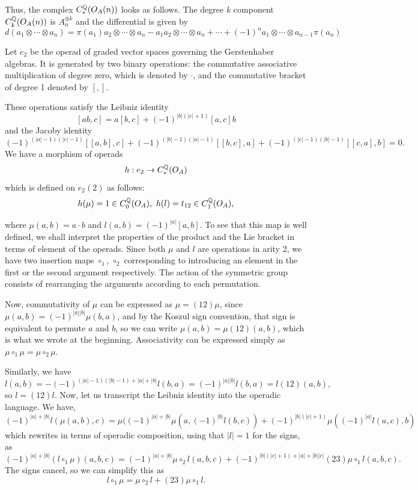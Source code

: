 \documentclass[TFM.tex]{subfiles}
\begin{document}
Thus, the complex $C_*^{\mathbb{Q}}(O_A(n))$ looks as follows. The degree $k$ component $C_k^{\mathbb{Q}}(O_A(n))$ is $A_n^{\otimes k}$ and the differential is given by %
\[
d(a_1\otimes\cdots\otimes a_n)=\pi(a_1)a_2\otimes\cdots\otimes a_n-a_1a_2\otimes \cdots\otimes a_n+\cdots+(-1)^{n}a_1\otimes\cdots\otimes a_{n-1}\pi(a_n)
\]

Let $e_2$ be the operad of graded vector spaces governing the Gerstenhaber algebras.
It is generated by two binary operations: the commutative associative multiplication of degree zero, which is denoted by $\cdot$, and the commutative bracket of degree 1 denoted by $[,]$. 

These operations satisfy the Leibniz identity
\[
[ab, c]= a[b, c]+(-1)^{|b|(|c|+1)}[a,c]b
\]
and the Jacoby identity
\[
(-1)^{(|a|-1)(|c|-1)}[[a,b],c]+(-1)^{(|b|-1)(|a|-1)}[[b,c],a]+(-1)^{(|c|-1)(|b|-1)}[[c,a],b]=0.
\]
We have a morphism of operads
\[
h:e_2\to C_*^{\mathbb{Q}}(O_A)
\]
which is defined on $e_2(2)$ as follows:
\[
h(\mu)=1\in C_0^\Q(O_A),\ h(l)=t_{12}\in C_1^\Q(O_A),
\]

where $\mu(a,b)=a\cdot b$ and $l(a,b)=(-1)^{|a|}[a,b]$. To see that this map is well defined, we shall interpret the properties of the product and the Lie bracket in terms of element of the operads. Since both $\mu$ and $l$ are operations in arity 2, we have two insertion maps $\circ_1$, $\circ_2$ corresponding to introducing an element in the first or the second argument respectively. The action of the symmetric group consists of rearranging the arguments according to each permutation.

Now, commutativity of $\mu$ can be expressed as $\mu=(12)\mu$, since $\mu(a,b)=(-1)^{|a||b|}\mu(b,a)$, and by the Koszul sign convention, that sign is equivalent to permute $a$ and $b$, so we can write $\mu(a,b)=\mu(12)(a,b)$, which is what we wrote at the beginning.  Associativity can be expressed simply as $\mu\circ_1\mu=\mu\circ_2\mu$.

Similarly, we have 
\[
l(a,b)=-(-1)^{(|a|-1)(|b|-1)+|a|+|b|}l(b,a)=(-1)^{|a||b|}l(b,a)=l(12)(a,b),
\]
so $l=(12)l$. Now, let us transcript the Leibniz identity into the operadic language. We have, 
\[
(-1)^{|a|+|b|}l(\mu(a,b),c)=\mu((-1)^{|a|+|b|}\mu(a,(-1)^{|b|}l(b,c))+(-1)^{|b|(|c|+1)}\mu((-1)^{|a|}l(a,c),b)
\]
which rewrites in terms of operadic composition, using that $|l|=1$ for the signs, as %
\[
(-1)^{|a|+|b|}(l\circ_1\mu)(a,b,c)=(-1)^{|a|+|b|}\mu\circ_2 l(a,b,c)+(-1)^{|b|(|c|+1)+|a|+|b||c|}(23)\mu\circ_1 l(a,b,c).
\]
The signs cancel, so we can simplify this as
\[
l\circ_1\mu =\mu\circ_2 l +(23)\mu\circ_1 l.
\]
\end{document}
